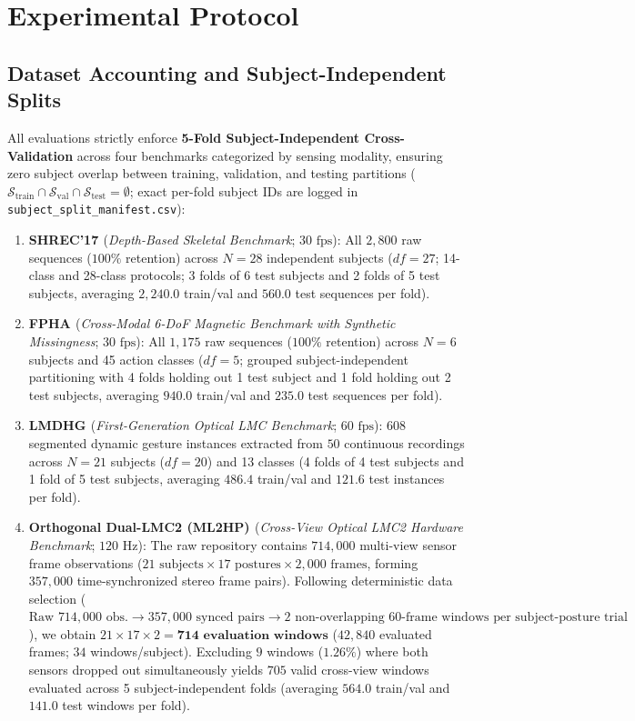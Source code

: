 \documentclass[10pt,twocolumn]{article}
\begin{document}
\section{Experimental Protocol}

\subsection{Dataset Accounting and Subject-Independent Splits}
All evaluations strictly enforce \textbf{5-Fold Subject-Independent Cross-Validation} across four benchmarks categorized by sensing modality, ensuring zero subject overlap between training, validation, and testing partitions ($\mathcal{S}_{\text{train}} \cap \mathcal{S}_{\text{val}} \cap \mathcal{S}_{\text{test}} = \emptyset$; exact per-fold subject IDs are logged in \texttt{subject\_split\_manifest.csv}):
\begin{enumerate}
    \item \textbf{SHREC'17 \cite{desmedt2017shrec}} (\textit{Depth-Based Skeletal Benchmark}; $30\text{ fps}$): All $2,800$ raw sequences ($100\%$ retention) across $N=28$ independent subjects ($df=27$; 14-class and 28-class protocols; 3 folds of 6 test subjects and 2 folds of 5 test subjects, averaging $2,240.0$ train/val and $560.0$ test sequences per fold).
    \item \textbf{FPHA \cite{garcia2018first}} (\textit{Cross-Modal 6-DoF Magnetic Benchmark with Synthetic Missingness}; $30\text{ fps}$): All $1,175$ raw sequences ($100\%$ retention) across $N=6$ subjects and 45 action classes ($df=5$; grouped subject-independent partitioning with 4 folds holding out 1 test subject and 1 fold holding out 2 test subjects, averaging $940.0$ train/val and $235.0$ test sequences per fold).
    \item \textbf{LMDHG \cite{boulahia2017dynamic}} (\textit{First-Generation Optical LMC Benchmark}; $60\text{ fps}$): $608$ segmented dynamic gesture instances extracted from $50$ continuous recordings across $N=21$ subjects ($df=20$) and 13 classes (4 folds of 4 test subjects and 1 fold of 5 test subjects, averaging $486.4$ train/val and $121.6$ test instances per fold).
    \item \textbf{Orthogonal Dual-LMC2 (ML2HP) \cite{gilmartin2024dual}} (\textit{Cross-View Optical LMC2 Hardware Benchmark}; $120\text{ Hz}$): The raw repository contains $714,000$ multi-view sensor frame observations ($21\text{ subjects} \times 17\text{ postures} \times 2,000\text{ frames}$, forming $357,000$ time-synchronized stereo frame pairs). Following deterministic data selection ($\text{Raw } 714,000\text{ obs.} \rightarrow 357,000\text{ synced pairs} \rightarrow 2\text{ non-overlapping } 60\text{-frame windows per subject-posture trial}$), we obtain $21 \times 17 \times 2 = \mathbf{714\text{ evaluation windows}}$ ($42,840$ evaluated frames; $34$ windows/subject). Excluding $9$ windows ($1.26\%$) where both sensors dropped out simultaneously yields $705$ valid cross-view windows evaluated across 5 subject-independent folds (averaging $564.0$ train/val and $141.0$ test windows per fold).
\end{enumerate}
\end{document}
